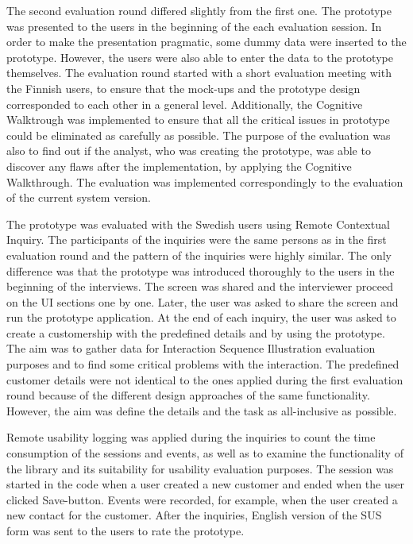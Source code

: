 \documentclass[12pt,a4paper,oneside,pdftex]{report}
\begin{document}
The second evaluation round differed slightly from the first one. The prototype was presented to the users in the beginning of the each evaluation session. In order to make the presentation pragmatic, some dummy data were inserted to the prototype. However, the users were also able to enter the data to the prototype themselves. The evaluation round started with a short evaluation meeting with the Finnish users, to ensure that the mock-ups and the prototype design corresponded to each other in a general level. Additionally, the Cognitive Walktrough was implemented to ensure that all the critical issues in prototype could be eliminated as carefully as possible. The purpose of the evaluation was also to find out if the analyst, who was creating the prototype, was able to discover any flaws after the implementation, by applying the Cognitive Walkthrough. The evaluation was implemented correspondingly to the evaluation of the current system version. 

The prototype was evaluated with the Swedish users using Remote Contextual Inquiry. The participants of the inquiries were the same persons as in the first evaluation round and the pattern of the inquiries were highly similar. The only difference was that the prototype was introduced thoroughly to the users in the beginning of the interviews. The screen was shared and the interviewer proceed on the UI sections one by one. Later, the user was asked to share the screen and run the prototype application. At the end of each inquiry, the user was asked to create a customership with the predefined details and by using the prototype. The aim was to gather data for Interaction Sequence Illustration evaluation purposes and to find some critical problems with the interaction. The predefined customer details were not identical to the ones applied during the first evaluation round because of the different design approaches of the same functionality. However, the aim was define the details and the task as all-inclusive as possible. 

Remote usability logging was applied during the inquiries to count the time consumption of the sessions and events, as well as to examine the functionality of the library and its suitability for usability evaluation purposes. The session was started in the code when a user created a new customer and ended when the user clicked Save-button. Events were recorded, for example, when the user created a new contact for the customer. After the inquiries, English version of the SUS form was sent to the users to rate the prototype.
\end{document}
